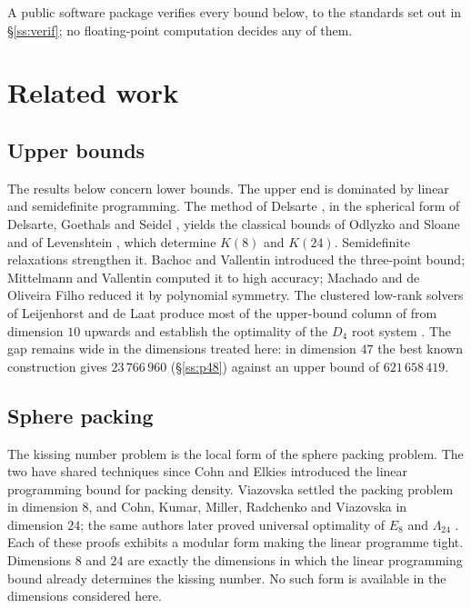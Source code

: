 \documentclass[11pt]{amsart}
\theoremstyle{remark}
\newcommand{\Leech}{\Lambda_{24}}
\begin{document}
A public software package \cite{repo} verifies every bound below, to the
standards set out in \S\ref{ss:verif}; no floating-point computation decides any
of them.

\section{Related work}\label{sec:related}

\subsection{Upper bounds}\label{ss:rw-upper}

The results below concern lower bounds. The upper end is dominated by linear and
semidefinite programming. The method of Delsarte \cite{delsarte1973}, in the spherical
form of Delsarte, Goethals and Seidel \cite{delsarte-goethals-seidel1977}, yields the
classical bounds of Odlyzko and Sloane \cite{odlyzko-sloane1979} and of Levenshtein
\cite{levenshtein1979}, which determine $K(8)$ and $K(24)$. Semidefinite relaxations
strengthen it. Bachoc and Vallentin \cite{bachoc-vallentin2008} introduced the
three-point bound; Mittelmann and Vallentin \cite{mittelmann-vallentin2010} computed it
to high accuracy; Machado and de Oliveira Filho \cite{machado-oliveira2018} reduced it by
polynomial symmetry. The clustered low-rank solvers of Leijenhorst and de Laat
\cite{leijenhorst-delaat2024} produce most of the upper-bound column of
\cite{cohn-table} from dimension $10$ upwards and establish the optimality of the
$D_4$ root system \cite{delaat-leijenhorst-demuinckkeizer2024}. The gap remains wide in
the dimensions treated here: in dimension $47$ the best known construction gives
$23\,766\,960$ (\S\ref{ss:p48}) against an upper bound of $621\,658\,419$.

\subsection{Sphere packing}\label{ss:rw-packing}

The kissing number problem is the local form of the sphere packing problem. The two
have shared techniques since Cohn and Elkies \cite{cohn-elkies2003} introduced the
linear programming bound for packing density. Viazovska \cite{viazovska2017} settled
the packing problem in dimension $8$, and Cohn, Kumar, Miller, Radchenko and
Viazovska \cite{cohn-kumar-miller-radchenko-viazovska2017} in dimension $24$; the same
authors later proved universal optimality of $E_8$ and $\Leech$
\cite{cohn-kumar-miller-radchenko-viazovska2022}. Each of these proofs exhibits a modular
form making the linear programme tight. Dimensions $8$ and $24$ are exactly the
dimensions in which the linear programming bound already determines the kissing
number. No such form is available
in the dimensions considered here.
\end{document}

